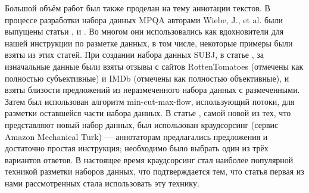 \documentclass[conference]{IEEEtran}
\begin{document}
Большой объём работ был также проделан на тему аннотации текстов. В процессе разработки набора данных MPQA авторами Wiebe, J., et al. были выпущены статьи \cite{instructions-for-annotating-opinions}, \cite{annotating-expressions-of-opinions} и \cite{annotating-private-states}. Во многом они использовались как вдохновители для нашей инструкции по разметке данных, в том числе, некоторые примеры были взяты из этих статей. При создании набора данных SUBJ, в статье \cite{subj}, за изначальные данные были взяты отзывы с сайтов RottenTomatoes (отмечены как полностью субъективные) и IMDb (отмечены как полностью объективные), и взяты близости предложений из неразмеченного набора данных с размеченными. Затем был использован алгоритм min-cut-max-flow, использующий потоки, для разметки оставшейся части набора данных. В статье \cite{wikipedia-biased-statements}, самой новой из тех, что представляют новый набор данных, был использован краудсорсинг (сервис Amazon Mechanical Turk) --- аннотаторам предлагались предложения и достаточно простая инструкция; необходимо было выбрать один из трёх вариантов ответов. В настоящее время краудсорсинг стал наиболее популярной техникой разметки наборов данных, что подтверждается тем, что статья \cite{wikipedia-biased-statements} первая из нами рассмотренных стала использовать эту технику.
\end{document}
